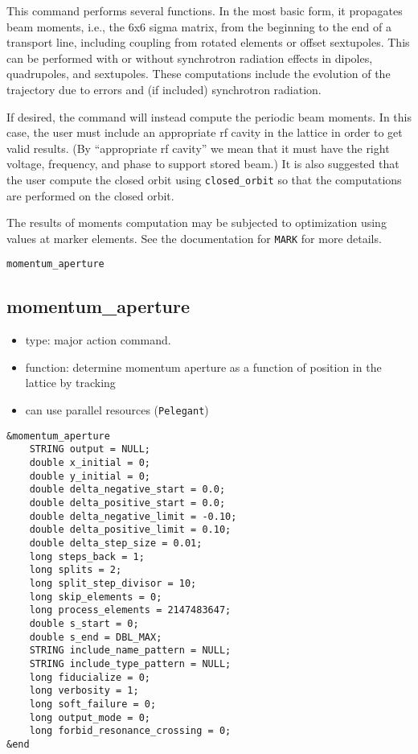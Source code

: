 \documentclass[11pt]{article}
\begin{document}
This command performs several functions.  In the most basic form, it
propagates beam moments, i.e., the 6x6 sigma matrix, from the
beginning to the end of a transport line, including coupling from
rotated elements or offset sextupoles. This can be performed with or
without synchrotron radiation effects in dipoles, quadrupoles, and sextupoles.
These computations
include the evolution of the trajectory due to errors and (if included)
synchrotron radiation.

If desired, the command will instead compute the periodic beam
moments.  In this case, the user must include an appropriate rf cavity
in the lattice in order to get valid results.  (By ``appropriate rf
cavity'' we mean that it must have the right voltage, frequency, and
phase to support stored beam.)  It is also suggested that the user
compute the closed orbit using \verb|closed_orbit| so that the
computations are performed on the closed orbit.

The results of moments computation may be subjected to optimization
using values at marker elements.  See the documentation for
\verb|MARK| for more details.

\newpage
\begin{center}{\Large\verb|momentum_aperture|}\end{center}
\subsection{momentum\_aperture \label{subsec:momentumaperture}}

\begin{itemize}
\item type: major action command.
\item function: determine momentum aperture as a function of position in the lattice by tracking
\item can use parallel resources (\verb|Pelegant|)
\end{itemize}

\begin{verbatim}
&momentum_aperture
    STRING output = NULL;
    double x_initial = 0;
    double y_initial = 0;
    double delta_negative_start = 0.0;
    double delta_positive_start = 0.0;
    double delta_negative_limit = -0.10;
    double delta_positive_limit = 0.10;
    double delta_step_size = 0.01;
    long steps_back = 1;
    long splits = 2;
    long split_step_divisor = 10;
    long skip_elements = 0;
    long process_elements = 2147483647;
    double s_start = 0;
    double s_end = DBL_MAX;
    STRING include_name_pattern = NULL;
    STRING include_type_pattern = NULL;
    long fiducialize = 0;
    long verbosity = 1;
    long soft_failure = 0;
    long output_mode = 0;
    long forbid_resonance_crossing = 0;
&end
\end{verbatim}
\end{document}
